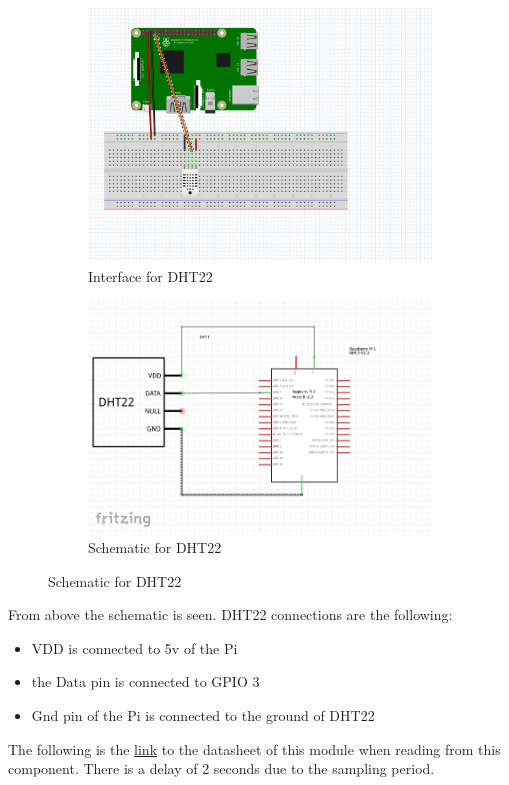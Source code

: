 \begin{figure}[h!]
	\centering
	\begin{subfigure}{0.6\textwidth}
		\includegraphics[width=\textwidth]{Images/InterfaceforDHT22.png}
		\caption{Interface for DHT22}
		\label{Interface for DHT22}
	\end{subfigure}
	\hfill
	\begin{subfigure}{0.6\textwidth}
		\includegraphics[width=\textwidth]{Images/schematicforDHT22.png}
		\caption{Schematic for DHT22}
		\label{Sychematic for DHT22 revised}
	\end{subfigure}
\end{figure}

From above the schematic is seen. DHT22 connections are the following:
\begin{itemize}
	\item VDD is connected to 5v of the Pi
	\item the Data pin is connected to GPIO 3
	\item Gnd pin  of the  Pi is  connected to the ground  of DHT22 

\end{itemize}
\cite{sparkfun} The following is the \href{https://www.sparkfun.com/datasheets/Sensors/Temperature/DHT22.pdf}{link} to the datasheet of this module
when reading from this  component. There is  a  delay  of 2 seconds due to the  sampling period.

